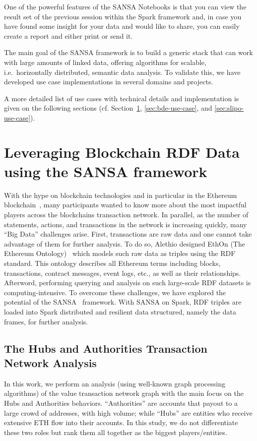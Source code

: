 One of the powerful features of the SANSA Notebooks is that you can view the result set of the previous session within the Spark framework and, in case you have found some insight for your data and would like to share, you can easily create a report and either print or send it.

The main goal of the SANSA framework is to build a generic stack that can work with large amounts of linked data, offering algorithms for scalable, i.e.~horizontally distributed, semantic data analysis.
To validate this, we have developed use case implementations in several domains and projects.
   
A more detailed list of use cases with technical details and implementation is given on the following sections (cf. Section~\ref{sec:alethio-use-case}, \ref{sec:bde-use-case}, and \ref{sec:slipo-use-case}).

\section{Leveraging Blockchain RDF Data using the SANSA framework}
\label{sec:alethio-use-case}
With the hype on blockchain technologies and in particular in the Ethereum blockchain~\cite{wood2014ethereum}, many participants wanted to know more about the most impactful players across the blockchains transaction network.
In parallel, as the number of statements, actions, and transactions in the network is increasing quickly, many ``Big Data'' challenges arise.
First, transactions are raw data and one cannot take advantage of them for further analysis.
To do so, Alethio designed EthOn (The Ethereum Ontology)~\cite{pfeffer2016ethon} which models such raw data as triples using the \gls{RDF} standard.
This ontology describes all Ethereum terms including blocks, transactions, contract messages, event logs, etc., as well as their relationships.
Afterword, performing querying and analysis on such large-scale \gls{RDF} datasets is computing-intensive.
To overcome these challenges, we have explored the potential of the SANSA~\cite{lehmann-2017-sansa-iswc} framework.
With SANSA on Spark, \gls{RDF} triples are loaded into Spark distributed and resilient data structured, namely the data frames, for further analysis.

\subsection{The Hubs and Authorities Transaction Network Analysis}
\label{sec:the-hub-and-authorities-use-case}
In this work, we perform an analysis (using well-known graph processing algorithms) of the value transaction network graph with the main focus on the Hubs and Authorities behaviors.
``Authorities'' are accounts that payout to a large crowd of addresses, with high volume; while ``Hubs'' are entities who receive extensive \gls{ETH} flow into their accounts.
In this study, we do not differentiate these two roles but rank them all together as the biggest players/entities.

